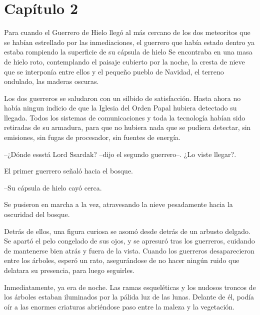 \chapter*{Capítulo 2}

Para cuando el Guerrero de Hielo llegó al más cercano de los dos meteoritos que se habían estrellado por las inmediaciones, el guerrero que había estado dentro ya estaba rompiendo la superficie de su cápsula de hielo Se encontraba en una masa de hielo roto, contemplando el paisaje cubierto por la noche, la cresta de nieve que se interponía entre ellos y el pequeño pueblo de Navidad, el terreno ondulado, las maderas oscuras.



Los dos guerreros se saludaron con un silbido de satisfacción. Hasta ahora no había ningun indicio de que la Iglesia del Orden Papal hubiera detectado su llegada. Todos los sistemas de comunicaciones y toda la tecnología habían sido retiradas de su armadura, para que no hubiera nada que se pudiera detectar, sin emisiones, sin fugas de procesador, sin fuentes de energía.



--¿Dónde essstá Lord Ssardak? --dijo el segundo guerrero--. ¿Lo viste llegar?.



El primer guerrero señaló hacia el bosque. 


--Su cápsula de hielo cayó cerca.



Se pusieron en marcha a la vez, atravesando la nieve pesadamente hacia la oscuridad del bosque.



Detrás de ellos, una figura curiosa se asomó desde detrás de un arbusto delgado. Se apartó el pelo congelado de sus ojos, y se apresuró tras los guerreros, cuidando de mantenerse bien atrás y fuera de la vista. Cuando los guerreros desaparecieron entre los árboles, esperó un rato, asegurándose de no hacer ningún ruido que delatara su presencia, para luego seguirles.



Inmediatamente, ya era de noche. Las ramas esqueléticas y los nudosos troncos de los árboles estaban iluminados por la pálida luz de las lunas. Delante de él, podía oír a las enormes criaturas abriéndose paso entre la maleza y la vegetación.



\mbox{}



